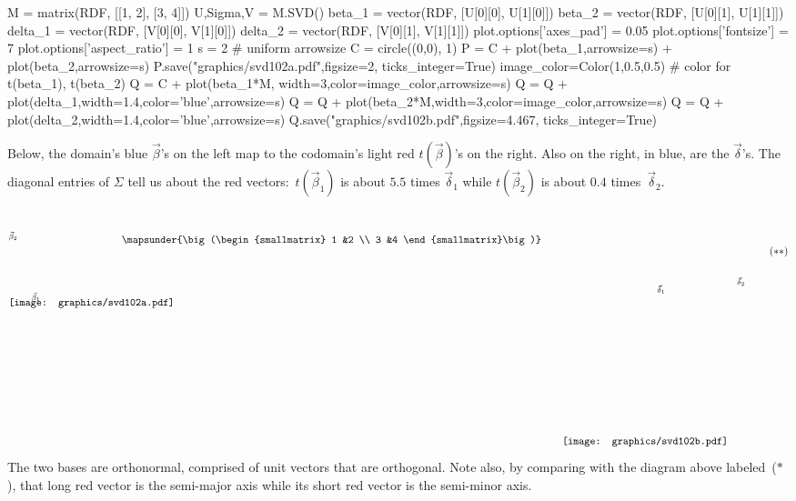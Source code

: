 \begin{sagesilent}
M = matrix(RDF, [[1, 2], [3, 4]])
U,Sigma,V = M.SVD()
beta_1 = vector(RDF, [U[0][0], U[1][0]])
beta_2 = vector(RDF, [U[0][1], U[1][1]])
delta_1 = vector(RDF, [V[0][0], V[1][0]])
delta_2 = vector(RDF, [V[0][1], V[1][1]])
plot.options['axes_pad'] = 0.05
plot.options['fontsize'] = 7
plot.options['aspect_ratio'] = 1
s = 2  # uniform arrowsize
C = circle((0,0), 1)
P = C + plot(beta_1,arrowsize=s) + plot(beta_2,arrowsize=s)
P.save("graphics/svd102a.pdf",figsize=2, ticks_integer=True)
image_color=Color(1,0.5,0.5)   # color for t(beta_1), t(beta_2)
Q = C + plot(beta_1*M, width=3,color=image_color,arrowsize=s) 
Q = Q + plot(delta_1,width=1.4,color='blue',arrowsize=s) 
Q = Q + plot(beta_2*M,width=3,color=image_color,arrowsize=s) 
Q = Q + plot(delta_2,width=1.4,color='blue',arrowsize=s)
Q.save("graphics/svd102b.pdf",figsize=4.467, ticks_integer=True)
\end{sagesilent}
Below, the domain's 
blue $\vec{\beta}$'s on the left map to the codomain's light red 
$t(\vec{\beta})$'s on the right.
Also on the right, in blue, are the $\vec{\delta}$'s.
The diagonal entries of $\Sigma$ tell us about the
red vectors:~$t(\vec{\beta}_1)$ is about $5.5$ times $\vec{\delta}_1$
while $t(\vec{\beta}_2)$ is about $0.4$ times~$\vec{\delta}_2$.
\begin{equation*}
  \setlength{\unitlength}{1in}
  \begin{picture}(1.35,1.35)
    \put(0,1.825){\texttt{[image: graphics/svd102a.pdf]}}
    \put(.3,1.9){\scriptsize $\vec{\beta}_1$}
    \put(0,2.7){\scriptsize $\vec{\beta}_2$}
  \end{picture}
  \quad
  \raisebox{2.65in}{$\mapsunder{\big (\begin{smallmatrix} 1 &2 \\ 3 &4 \end{smallmatrix}\big )}$}
  \qquad
  \begin{picture}(2.45,3.15)
    \put(0,0){\texttt{[image: graphics/svd102b.pdf]}}
    \put(1.25,2){\scriptsize $\vec{\delta}_1$}
    \put(2.3,2.1){\scriptsize $\vec{\delta}_2$}
  \end{picture}
  \tag*{\raisebox{2.5in}{($**$)}}
\end{equation*}
The two bases are orthonormal,
comprised of unit vectors that are orthogonal.
Note also, by comparing with the diagram above labeled~($*$), that
long red vector is the
semi-major axis while its short red vector is the  
semi-minor axis.



